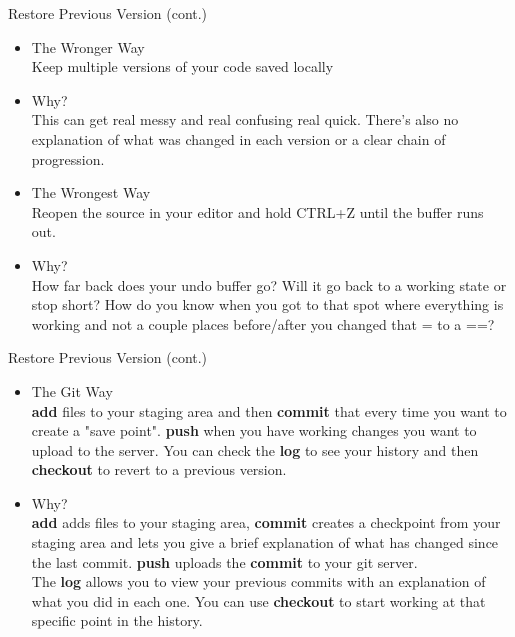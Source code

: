 \documentclass{beamer}
\begin{document}
\begin{frame}{Restore Previous Version (cont.)}
\begin{itemize}
  \item The Wronger Way\\
          Keep multiple versions of your code saved locally
  \pause
  \item Why?\\
        This can get real messy and real confusing real quick. There's also no explanation of what was changed in each version or a clear chain of progression.
  \pause
  \item The Wrongest Way\\
          Reopen the source in your editor and hold CTRL+Z until the buffer runs out.
  \pause
  \item Why?\\
        How far back does your undo buffer go? Will it go back to a working state or stop short? How do you know when you got to that spot where everything is working and not a couple places before/after you changed that = to a ==?
        \end{itemize}
\end{frame}

\begin{frame}{Restore Previous Version (cont.)}
\begin{itemize}
  \item The Git Way\\
        \textbf{add} files to your staging area and then \textbf{commit} that  every time you want to create a "save point". \textbf{push} when you have working changes you want to upload to the server. You can check the \textbf{log} to see your history and then \textbf{checkout} to revert to a previous version.
  \pause
  \item Why?\\
        \textbf{add} adds files to your staging area, \textbf{commit} creates a checkpoint from your staging area and lets you give a brief explanation of what has changed since the last commit. \textbf{push} uploads the \textbf{commit} to your git server.\\
        The \textbf{log} allows you to view your previous commits with an explanation of what you did in each one. You can use \textbf{checkout} to start working at that specific point in the history.
  \end{itemize}
  

\end{frame}
\end{document}

